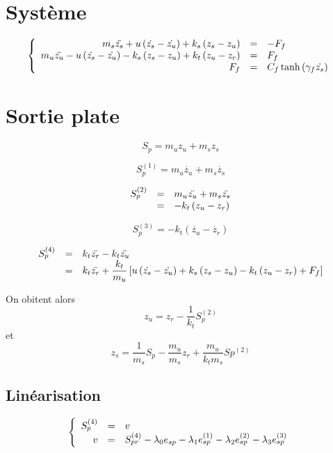 \documentclass[10pt]{article}
\begin{document}
\section{Système}

\[
\left\{
\begin{array}{r c l}
  m_s \ddot{z_s} + u \left( \dot{z_s} - \dot{z_u} \right) + k_s \left( z_s - z_u \right) & = & - F_f \\
  m_u \ddot{z_u} - u \left( \dot{z_s} - \dot{z_u} \right) - k_s \left( z_s - z_u \right) + k_t \left( z_u - z_r \right) & = & F_f \\
  F_f & = & C_f \tanh\left(\gamma_f \dot{z_s} \right) \\
\end{array}
\right.
\]

\section{Sortie plate}
\[
S_p = m_u z_u + m_s z_s
\]

\[
S_p^{(1)} = m_u \dot{z_u} + m_s \dot{z_s}
\]

\[
\begin{array}{r c l}
  S_p^{(2)} &=& m_u \ddot{z_u} + m_s \ddot{z_s} \\
  &=& - k_t \left( z_u - z_r \right) \\
\end{array}
\]

\[
S_p^{(3)} = - k_t \left( \dot{z_u} - \dot{z_r} \right)
\]

\[
\begin{array}{r c l}
  S_p^{(4)} &=& k_t \ddot{z_r} - k_t \ddot{z_u} \\
  &=& k_t \ddot{z_r} + \dfrac{k_t}{m_u} \left[ u \left( \dot{z_s} - \dot{z_u} \right) + k_s \left( z_s - z_u \right) - k_t \left( z_u - z_r \right) + F_f \right] \\
\end{array}
\]

On obitent alors
\[
z_u = z_r - \dfrac{1}{k_t} S_p^{(2)}
\]
et
\[
z_s = \dfrac{1}{m_s} S_p - \dfrac{m_u}{m_s} z_r + \dfrac{m_u}{k_t m_s} Sp^{(2)}
\]

\subsection{Linéarisation}

\[
\left\{
\begin{array}{r c l}
  S_p^{(4)} &=& v \\
  v &=& S_{pr}^{(4)} - \lambda_0 e_{sp} - \lambda_1 e_{sp}^{(1)} - \lambda_2 e_{sp}^{(2)} - \lambda_3 e_{sp}^{(3)} \\
\end{array}
\right.
\]
\end{document}
